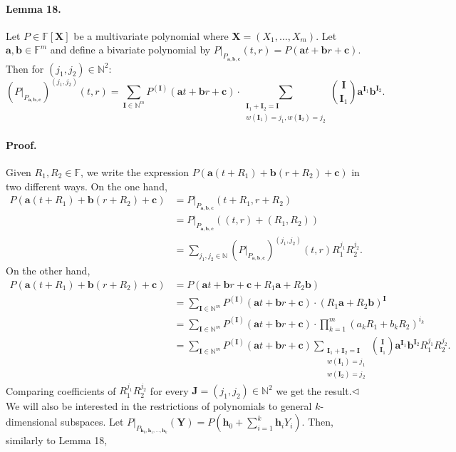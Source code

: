 \documentclass[10pt,a4paper]{article}
\begin{document}
\paragraph{Lemma 18.} Let $P\in\mathbb F[\boldsymbol X]$ be a multivariate polynomial where $\boldsymbol X=(X_1,\ldots,X_m)$. Let $\boldsymbol a,\boldsymbol b\in\mathbb F^m$ and define a bivariate polynomial by $P|_{P_{\boldsymbol a,\boldsymbol b,\boldsymbol c}}(t,r)=P(\boldsymbol at+\boldsymbol br+\boldsymbol c)$. Then for $(j_1,j_2)\in\mathbb N^2$:
\[(P|_{P_{\boldsymbol a,\boldsymbol b,\boldsymbol c}})^{(j_1,j_2)}(t,r)=\sum_{\boldsymbol I\in\mathbb N^m}P^{(\boldsymbol I)}(\boldsymbol at+\boldsymbol br+\boldsymbol c)\cdot\sum_{\substack{\boldsymbol I_1+\boldsymbol I_2=\boldsymbol I\\w(\boldsymbol I_1)=j_1,w(\boldsymbol I_2)=j_2}}\binom{\boldsymbol I}{\boldsymbol I_1}\boldsymbol a^{\boldsymbol I_1}\boldsymbol b^{\boldsymbol I_2}.\]
\paragraph{Proof.} Given $R_1,R_2\in\mathbb F$, we write the expression $P(\boldsymbol a(t+R_1)+\boldsymbol b(r+R_2)+\boldsymbol c)$ in two different ways. On the one hand,
\begin{align*}
P(\boldsymbol a(t+R_1)+\boldsymbol b(r+R_2)+\boldsymbol c)
&=P|_{P_{\boldsymbol a,\boldsymbol b,\boldsymbol c}}(t+R_1,r+R_2)\\
&=P|_{P_{\boldsymbol a,\boldsymbol b,\boldsymbol c}}((t,r)+(R_1,R_2))\\
&=\sum_{j_1,j_2\in\mathbb N}(P|_{P_{\boldsymbol a,\boldsymbol b,\boldsymbol c}})^{(j_1,j_2)}(t,r)R_1^{j_1}R_2^{j_2}.
\end{align*}
On the other hand,
\begin{align*}
P(\boldsymbol a(t+R_1)+\boldsymbol b(r+R_2)+\boldsymbol c)
&=P(\boldsymbol at+\boldsymbol br+\boldsymbol c+R_1\boldsymbol a+R_2\boldsymbol b)\\
&=\sum_{\boldsymbol I\in\mathbb N^m}P^{(\boldsymbol I)}(\boldsymbol at+\boldsymbol br+\boldsymbol c)\cdot(R_1\boldsymbol a+R_2\boldsymbol b)^{\boldsymbol I}\\
&=\sum_{\boldsymbol I\in\mathbb N^m}P^{(\boldsymbol I)}(\boldsymbol at+\boldsymbol br+\boldsymbol c)\cdot\prod_{k=1}^m(a_kR_1+b_kR_2)^{i_k}\\
&=\sum_{\boldsymbol I\in\mathbb N^m}P^{(\boldsymbol I)}(\boldsymbol at+\boldsymbol br+\boldsymbol c)
\sum_{\substack{\boldsymbol I_1+\boldsymbol I_2=\boldsymbol I\\w(\boldsymbol I_1)=j_1\\w(\boldsymbol I_2)=j_2}}\binom{\boldsymbol I}{\boldsymbol I_1}\boldsymbol a^{\boldsymbol I_1}\boldsymbol b^{\boldsymbol I_2}R_1^{j_1}R_2^{j_2}.
\end{align*}
Comparing coefficients of $R_1^{j_1}R_2^{j_2}$ for every $\boldsymbol J=(j_1,j_2)\in\mathbb N^2$ we get the result.\hfill$\triangleleft$
We will also be interested in the restrictions of polynomials to general $k$-dimensional subspaces. Let $P|_{P_{\boldsymbol h_0,\boldsymbol h_1,\ldots,\boldsymbol h_k}}(\boldsymbol Y)=P(\boldsymbol h_0+\sum_{i=1}^k\boldsymbol h_iY_i)$. Then, similarly to Lemma 18,
\end{document}
